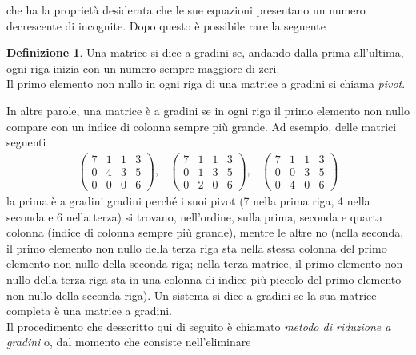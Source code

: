 \documentclass{book}
\theoremstyle{definition}
\newtheorem{defi}{Definizione}[section]
\theoremstyle{plain}
\begin{document}
che ha la proprietà desiderata che le sue equazioni presentano un numero
decrescente di incognite.
Dopo questo è possibile rare la seguente
\begin{defi}
  \label{defi:gauss-jorda1}
  Una matrice si dice a gradini se, andando dalla prima all'ultima,
  ogni riga inizia con un numero sempre maggiore di zeri.\\
  Il primo elemento non nullo in ogni riga di una matrice a gradini si
  chiama \textit{pivot}.
\end{defi}
In altre parole, una matrice è a gradini se in ogni riga il primo elemento
non nullo compare con un indice di colonna sempre più grande. Ad esempio,
delle matrici seguenti
\begin{eqnarray*}
  \begin{pmatrix}
    7 & 1 & 1 & 3\\
    0 & 4 & 3 & 5\\
    0 & 0 & 0 & 6
  \end{pmatrix}, &
                   \begin{pmatrix}
                     7 & 1 & 1 & 3\\
                     0 & 1 & 3 & 5\\
                     0 & 2 & 0 & 6
                   \end{pmatrix}, &
                                   \begin{pmatrix}
                                     7 & 1 & 1 & 3\\
                                     0 & 0 & 3 & 5\\
                                     0 & 4 & 0 & 6
                                   \end{pmatrix}
\end{eqnarray*}
la prima è a gradini gradini perché i suoi pivot (7 nella prima riga,
4 nella seconda e 6 nella terza) si trovano, nell'ordine, sulla prima,
seconda e quarta colonna (indice di colonna sempre più grande), mentre
le altre no (nella seconda, il primo elemento non nullo della terza riga
sta nella stessa colonna del primo elemento non nullo della seconda riga;
nella terza matrice, il primo elemento non nullo della terza riga sta in
una colonna di indice più piccolo del primo elemento non nullo della
seconda riga). Un sistema si dice a gradini se la sua matrice completa è
una matrice a gradini.\\
Il procedimento che desscritto qui di seguito è chiamato \textit{metodo
  di riduzione a gradini} o, dal momento che consiste nell'eliminare
\end{document}
